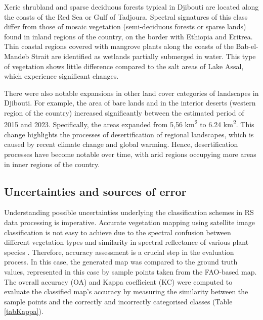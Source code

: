 \documentclass[jimaging,article,accept,pdftex,moreauthors]{Definitions/mdpi}
\begin{document}
Xeric shrubland and sparse deciduous forests typical in Djibouti {are} located along the coasts of the Red Sea or Gulf of Tadjoura. {Spectral} signatures {of this class} differ from those of mosaic vegetation (semi-deciduous forests or sparse lands) found in inland regions of the country, on the border with Ethiopia and Eritrea. {Thin} coastal regions covered with mangrove plants along the coasts of the Bab-el-Mandeb Strait {are identified as} wetlands partially submerged in water. This {type} of vegetation shows {little} difference compared to the salt areas of Lake Assal, which experience significant changes. 

{There were also notable expansions in other land cover categories of landscapes in Djibouti.  For example, the area of bare lands and in the interior deserts (western region of the country) increased significantly between the estimated period of 2015 and 2023. Specifically, the areas expanded from {5,56} %
km\textsuperscript{2} to 6.24 km\textsuperscript{2}. This change highlights the processes of desertification of regional landscapes, which is caused by recent climate change and global warming. Hence, desertification processes have become notable over time, with arid regions occupying more areas in inner regions of the country.}

\subsection{Uncertainties and sources of error}

{Understanding possible uncertainties underlying the classification schemes in RS data processing is imperative. }Accurate vegetation mapping using satellite image classification is not easy to achieve due to the spectral confusion between different vegetation types and{ }similarity in spectral reflectance of various plant species \cite{1370179,Dobrowski,Moore,8688643}. {Therefore, accuracy assessment is a crucial step in the evaluation process. In this case, the generated map was compared to the ground truth values, represented in this case by sample points taken from the FAO-based map}. {The overall accuracy (OA) and Kappa coefficient {(KC)} were computed to evaluate the classified map's accuracy by measuring the similarity between the sample points and the correctly and incorrectly categorised classes (Table} \ref{tabKappa}). 
\end{document}
